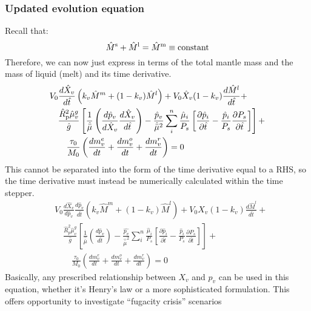 \subsubsection{Updated evolution equation}
Recall that:
\begin{equation}
\hat{M}^{\rm s} + \hat{M}^{\rm l} = \hat{M}^{\rm m} \equiv \text{constant}
\label{eq:mantle_mass}
\end{equation}
Therefore, we can now just express in terms of the total mantle mass and the mass of liquid (melt) and its time derivative.   
\begin{align}
&V_0 \frac{d \hat{X}_v}{d\hat{t}} \left(k_v \hat{M}^m + (1-k_v) \hat{M}^l \right)
+ V_0 \hat{X}_v (1-k_v) \frac{d \hat{M}^l}{d\hat{t}} + \nonumber \\
&\quad \frac{\hat{R}_{\rm p}^2 \hat{\mu}_v^g}{\hat{g}}
\left[
 \frac{1}{\hat{\bar{\mu}}} \left( \frac{d \hat{p}_v}{d \hat{X}_v} \frac{d \hat{X}_v}{d \hat{t}} \right)
-\frac{\hat{p}_v}{\hat{\bar{\mu}}^2} \sum_i^n \frac{\hat{\mu}_i}{P_s} \left[ \frac{\partial \hat{p}_i}{\partial \hat{t}} - \frac{\hat{p}_i}{P_s} \frac{\partial P_s}{\partial \hat{t}} \right]
\right]+ \nonumber \\
& \qquad \frac{\tau_0}{M_0} \left( \frac{dm_v^e}{dt} +  \frac{dm_v^o}{dt} + \frac{dm_v^r}{dt} \right) = 0
\end{align}
This cannot be separated into the form of the time derivative equal to a RHS, so the time derivative must instead be numerically calculated within the time stepper.
\begin{align}
& V_0 \frac{d \hat{X}_v}{d\hat{p}_v} \frac{d \hat{p}_v}{d\hat{t}} \left(k_v \hat{M}^m + (1-k_v) \hat{M}^l \right)
+ V_0 \hat{X}_v (1-k_v) \frac{d \hat{M}^l}{d\hat{t}} + \nonumber \\
&\quad \frac{\hat{R}_p^2 \hat{\mu}_v^g}{\hat{g}}
\left[
\frac{1}{\hat{\bar{\mu}}} \left( \frac{d \hat{p}_v}{d \hat{t}} \right)
-\frac{\hat{p_v}}{\hat{\bar{\mu}}^2} \sum_i^n \frac{\hat{\mu}_i}{P_s} \left[ \frac{\partial \hat{p}_i}{\partial \hat{t}} - \frac{\hat{p}_i}{P_s} \frac{\partial P_s}{\partial \hat{t}} \right]
\right]+ \nonumber \\
& \qquad \frac{\tau_0}{M_0} \left( \frac{dm_v^e}{dt} +  \frac{dm_v^o}{dt} + \frac{dm_v^r}{dt} \right) = 0
\end{align}
Basically, any prescribed relationship between $X_v$ and $p_v$ can be used in this equation, whether it's Henry's law or a more sophisticated formulation.  This offers opportunity to investigate ``fugacity crisis'' scenarios \citep{KFS19,KFS20}

